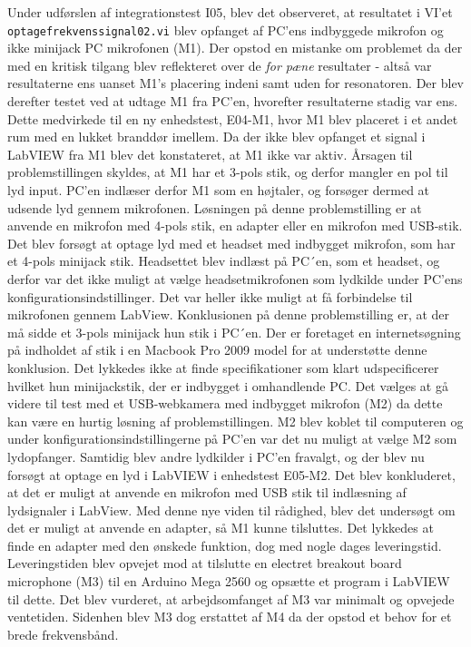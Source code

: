 Under udførslen af integrationstest I05, blev det observeret, at resultatet i VI'et \texttt{optagefrekvenssignal02.vi} blev opfanget af PC'ens indbyggede mikrofon og ikke minijack PC mikrofonen (M1). Der opstod en mistanke om problemet da der med en kritisk tilgang blev reflekteret over de \textit{for pæne} resultater - altså var resultaterne ens uanset M1's placering indeni samt uden for resonatoren. Der blev derefter testet ved at udtage M1 fra PC'en, hvorefter resultaterne stadig var ens. Dette medvirkede til en ny enhedstest, E04-M1, hvor M1 blev placeret i et andet rum med en lukket branddør imellem. Da der ikke blev opfanget et signal i LabVIEW fra M1 blev det konstateret, at M1 ikke var aktiv. Årsagen til problemstillingen skyldes, at M1 har et 3-pols stik, og derfor mangler en pol til lyd input. PC'en indlæser derfor M1 som en højtaler, og forsøger dermed at udsende lyd gennem mikrofonen. 
Løsningen på denne problemstilling er at anvende en mikrofon med 4-pols stik, en adapter eller en mikrofon med USB-stik.
Det blev forsøgt at optage lyd med et headset med indbygget mikrofon, som har et 4-pols minijack stik. Headsettet blev indlæst på PC´en, som et headset, og derfor var det ikke muligt at vælge headsetmikrofonen som lydkilde under PC'ens konfigurationsindstillinger. Det var heller ikke muligt at få forbindelse til mikrofonen gennem LabView. Konklusionen på denne problemstilling er, at der må sidde et 3-pols minijack hun stik i PC´en. Der er foretaget en internetsøgning på indholdet af stik i en Macbook Pro 2009 model for at understøtte denne konklusion. Det lykkedes ikke at finde specifikationer som klart udspecificerer hvilket hun minijackstik, der er indbygget i omhandlende PC. Det vælges at gå videre til test med et USB-webkamera med indbygget mikrofon (M2) da dette kan være en hurtig løsning af problemstillingen. M2 blev koblet til computeren og under konfigurationsindstillingerne på PC'en var det nu muligt at vælge M2 som lydopfanger. Samtidig blev andre lydkilder i PC'en fravalgt, og der blev nu forsøgt at optage en lyd i LabVIEW i enhedstest E05-M2. Det blev konkluderet, at det er muligt at anvende en mikrofon med USB stik til indlæsning af lydsignaler i LabView. Med denne nye viden til rådighed, blev det undersøgt om det er muligt at anvende en adapter, så M1 kunne tilsluttes. Det lykkedes at finde en adapter med den ønskede funktion, dog med nogle dages leveringstid. Leveringstiden blev opvejet mod at tilslutte en electret breakout board microphone (M3) til en Arduino Mega 2560 og opsætte et program i LabVIEW til dette. Det blev vurderet, at arbejdsomfanget af M3 var minimalt og opvejede ventetiden. Sidenhen blev M3 dog erstattet af M4 da der opstod et behov for et brede frekvensbånd. 

